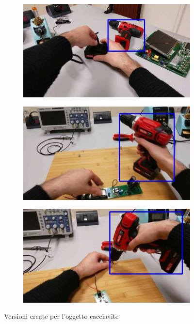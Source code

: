 \begin{figure}[ht]
    \centering
    \begin{subfigure}[b]{0.32\linewidth}
        \includegraphics[width=\linewidth]{Images/enigma_am_IMGVER1.jpg}
        \caption{}
        \label{fig:imgver1}
    \end{subfigure}
    \hfill
    \begin{subfigure}[b]{0.32\linewidth}
        \includegraphics[width=\linewidth]{Images/enigma_am_IMGVER2.jpg}
        \caption{}
        \label{fig:imgver2}
    \end{subfigure}
    \hfill
    \begin{subfigure}[b]{0.32\linewidth}
        \includegraphics[width=\linewidth]{Images/enigma_am_IMGVER3.jpg}
        \caption{}
        \label{fig:imgver3}
    \end{subfigure}
    \caption{Versioni create per l'oggetto cacciavite}
    \label{fig:enigma_am_screwdrivers}
\end{figure}

